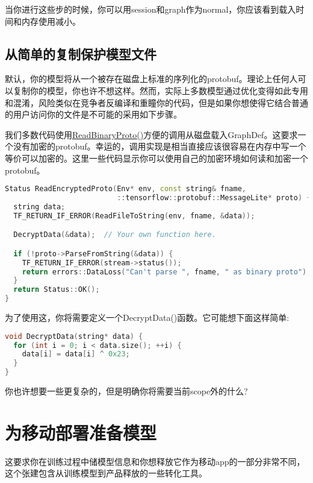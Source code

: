 当你进行这些步的时候，你可以用session和graph作为normal，你应该看到载入时间和内存使用减小。

\subsection{从简单的复制保护模型文件}
默认，你的模型将从一个被存在磁盘上标准的序列化的protobuf。理论上任何人可以复制你的模型，你也许不想这样。然而，实际上多数模型通过优化变得如此专用和混淆，风险类似在竞争者反编译和重瞳你的代码，但是如果你想使得它结合普通的用户访问你的文件是不可能的采用如下步骤。

我们多数代码使用\href{https://www.github.com/tensorflow/tensorflow/blob/r1.4/tensorflow/core/platform/env.cc?q=core/platform/env.cc&l=409}{ReadBinaryProto()}方便的调用从磁盘载入GraphDef。这要求一个没有加密的protobuf。幸运的，调用实现是相当直接应该很容易在内存中写一个等价可以加密的。这里一些代码显示你可以使用自己的加密环境如何读和加密一个protobuf。
\begin{lstlisting}[language=C++]
Status ReadEncryptedProto(Env* env, const string& fname,
                          ::tensorflow::protobuf::MessageLite* proto) {
  string data;
  TF_RETURN_IF_ERROR(ReadFileToString(env, fname, &data));

  DecryptData(&data);  // Your own function here.

  if (!proto->ParseFromString(&data)) {
    TF_RETURN_IF_ERROR(stream->status());
    return errors::DataLoss("Can't parse ", fname, " as binary proto");
  }
  return Status::OK();
}
\end{lstlisting}
为了使用这，你将需要定义一个DecryptData()函数。它可能想下面这样简单:
\begin{lstlisting}[language=C++]
void DecryptData(string* data) {
  for (int i = 0; i < data.size(); ++i) {
    data[i] = data[i] ^ 0x23;
  }
}

\end{lstlisting}
你也许想要一些更复杂的，但是明确你将需要当前scope外的什么?
\section{为移动部署准备模型}
这要求你在训练过程中储模型信息和你想释放它作为移动app的一部分非常不同，这个张建包含从训练模型到产品释放的一些转化工具。
